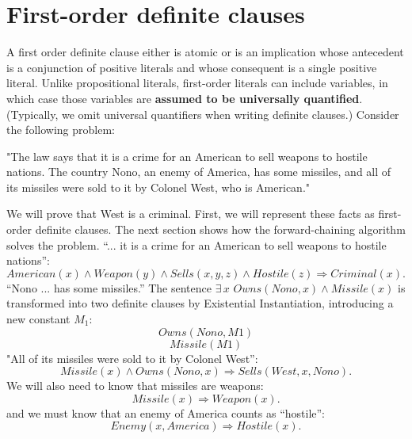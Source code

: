 \section{First-order definite clauses}
A first order definite clause either is atomic or is an implication whose antecedent is a conjunction of positive literals and whose consequent is a single positive literal. Unlike propositional literals, first-order literals can include variables, in which case those variables are \textbf{assumed to be universally quantified}. (Typically, we omit universal quantifiers when writing definite clauses.) Consider the following problem:
\begin{center}
    "The law says that it is a crime for an American to sell weapons to hostile nations. The country Nono, an enemy of America, has some missiles, and all of its missiles were sold to it by Colonel West, who is American."
\end{center}
We will prove that West is a criminal. First, we will represent these facts as first-order definite clauses. The next section shows how the forward-chaining algorithm solves the problem.\newline\newline
“... it is a crime for an American to sell weapons to hostile nations”:
\begin{equation}
    American(x) \land Weapon(y) \land Sells(x, y, z) \land Hostile(z) \Rightarrow Criminal(x).
\end{equation}
“Nono ... has some missiles.” The sentence $\exists \, x \,\, Owns(Nono, x) \land Missile(x)$ is transformed into two definite clauses by Existential Instantiation, introducing a new constant $M_1$:
\begin{equation}
    Owns(Nono, M1) 
\end{equation}
\begin{equation}
    Missile(M1)
\end{equation}
"All of its missiles were sold to it by Colonel West”:
\begin{equation}
    Missile(x) \land Owns(Nono, x) \Rightarrow Sells(West, x, Nono).
\end{equation}
We will also need to know that missiles are weapons:
\begin{equation}
    Missile(x) \Rightarrow Weapon(x).
\end{equation}
and we must know that an enemy of America counts as “hostile”:
\begin{equation}
    Enemy(x, America) \Rightarrow Hostile(x).
\end{equation}
